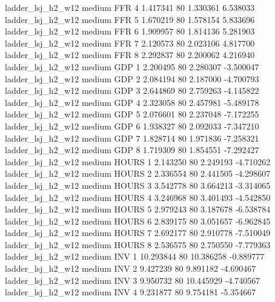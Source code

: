   ladder_lsj_h2_w12     medium      FFR                 4  1.417341 80       1.330361           6.538033
  ladder_lsj_h2_w12     medium      FFR                 5  1.670219 80       1.578154           5.833696
  ladder_lsj_h2_w12     medium      FFR                 6  1.909957 80       1.814136           5.281903
  ladder_lsj_h2_w12     medium      FFR                 7  2.120573 80       2.023106           4.817700
  ladder_lsj_h2_w12     medium      FFR                 8  2.292837 80       2.200062           4.216940
  ladder_lsj_h2_w12     medium      GDP                 1  2.200495 80       2.280307          -3.500047
  ladder_lsj_h2_w12     medium      GDP                 2  2.084194 80       2.187000          -4.700793
  ladder_lsj_h2_w12     medium      GDP                 3  2.644869 80       2.759263          -4.145822
  ladder_lsj_h2_w12     medium      GDP                 4  2.323058 80       2.457981          -5.489178
  ladder_lsj_h2_w12     medium      GDP                 5  2.076601 80       2.237048          -7.172255
  ladder_lsj_h2_w12     medium      GDP                 6  1.938327 80       2.092033          -7.347210
  ladder_lsj_h2_w12     medium      GDP                 7  1.828714 80       1.971836          -7.258321
  ladder_lsj_h2_w12     medium      GDP                 8  1.719309 80       1.854551          -7.292427
  ladder_lsj_h2_w12     medium    HOURS                 1  2.143250 80       2.249193          -4.710262
  ladder_lsj_h2_w12     medium    HOURS                 2  2.336554 80       2.441505          -4.298607
  ladder_lsj_h2_w12     medium    HOURS                 3  3.542778 80       3.664213          -3.314065
  ladder_lsj_h2_w12     medium    HOURS                 4  3.246968 80       3.401493          -4.542850
  ladder_lsj_h2_w12     medium    HOURS                 5  2.979243 80       3.187678          -6.538784
  ladder_lsj_h2_w12     medium    HOURS                 6  2.839175 80       3.051657          -6.962845
  ladder_lsj_h2_w12     medium    HOURS                 7  2.692177 80       2.910778          -7.510049
  ladder_lsj_h2_w12     medium    HOURS                 8  2.536575 80       2.750550          -7.779363
  ladder_lsj_h2_w12     medium      INV                 1 10.293844 80      10.386258          -0.889777
  ladder_lsj_h2_w12     medium      INV                 2  9.427239 80       9.891182          -4.690467
  ladder_lsj_h2_w12     medium      INV                 3  9.950732 80      10.445929          -4.740567
  ladder_lsj_h2_w12     medium      INV                 4  9.231877 80       9.754181          -5.354667
